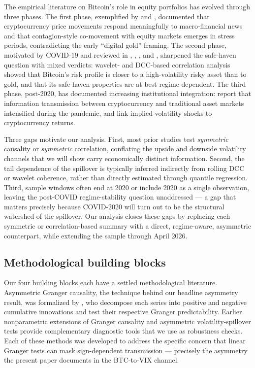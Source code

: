 \documentclass[11pt,a4paper]{article}
\begin{document}
The empirical literature on Bitcoin's role in equity portfolios has evolved through three phases. The first phase, exemplified by \citet{corbet2018} and \citet{matkovskyy2019}, documented that cryptocurrency price movements respond meaningfully to macro-financial news and that contagion-style co-movement with equity markets emerges in stress periods, contradicting the early ``digital gold'' framing. The second phase, motivated by COVID-19 and reviewed in \citet{bouri2020}, \citet{conlon2020}, \citet{shahzad2019}, and \citet{klein2018}, sharpened the safe-haven question with mixed verdicts: wavelet- and DCC-based correlation analysis showed that Bitcoin's risk profile is closer to a high-volatility risky asset than to gold, and that its safe-haven properties are at best regime-dependent. The third phase, post-2020, has documented increasing institutional integration: \citet{yarovaya2022} report that information transmission between cryptocurrency and traditional asset markets intensified during the pandemic, and \citet{akyildirim2020} link implied-volatility shocks to cryptocurrency returns.

Three gaps motivate our analysis. First, most prior studies test \emph{symmetric} causality or \emph{symmetric} correlation, conflating the upside and downside volatility channels that we will show carry economically distinct information. Second, the tail dependence of the spillover is typically inferred indirectly from rolling DCC or wavelet coherence, rather than directly estimated through quantile regression. Third, sample windows often end at 2020 or include 2020 as a single observation, leaving the post-COVID regime-stability question unaddressed --- a gap that matters precisely because COVID-2020 will turn out to be the structural watershed of the spillover. Our analysis closes these gaps by replacing each symmetric or correlation-based summary with a direct, regime-aware, asymmetric counterpart, while extending the sample through April 2026.

\subsection{Methodological building blocks}

Our four building blocks each have a settled methodological literature. Asymmetric Granger causality, the technique behind our headline asymmetry result, was formalized by \citet{hatemi2012}, who decompose each series into positive and negative cumulative innovations and test their respective Granger predictability. Earlier nonparametric extensions of Granger causality \citep{diks2006} and asymmetric volatility-spillover tests \citep{hong2001} provide complementary diagnostic tools that we use as robustness checks. Each of these methods was developed to address the specific concern that linear Granger tests can mask sign-dependent transmission --- precisely the asymmetry the present paper documents in the BTC-to-VIX channel.
\end{document}
